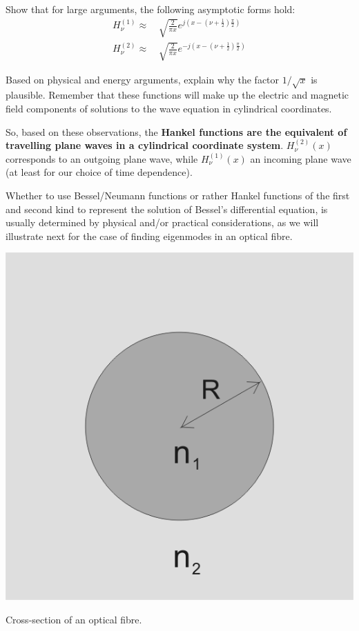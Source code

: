 \begin{exer}
Show that for large arguments, the following asymptotic forms hold:
\begin{align}
H_{\nu}^{(1)} \approx & \, \sqrt{\frac{2}{\pi x}} e^{j \left( x - \left(\nu + \frac{1}{2}\right)\frac{\pi}{2} \right)} \nonumber \\
  H_{\nu}^{(2)} \approx & \, \sqrt{\frac{2}{\pi x}} e^{-j \left( x - \left(\nu + \frac{1}{2}\right)\frac{\pi}{2} \right)}
\end{align}

Based on physical and energy arguments, explain why the factor $1/\sqrt{x}$ is plausible. Remember that these functions will make up the electric and magnetic field components of solutions to the wave equation in cylindrical coordinates.
                          
\end{exer}

So, based on these observations, the \textbf{Hankel functions are the equivalent of travelling plane waves in a cylindrical coordinate system}.   $H_{\nu}^{(2)}(x)$ corresponds to an outgoing plane wave, while $H_{\nu}^{(1)}(x)$ \is an incoming plane wave (at least for our choice of time dependence).

Whether to use Bessel/Neumann functions or rather Hankel functions of the first and second kind to represent the solution of Bessel's differential equation, is usually determined by physical and/or practical considerations, as we will illustrate next for the case of finding eigenmodes in an optical fibre.


\pagebreak




\begin{marginfigure}[3cm]
\centering
\includegraphics{bessel/figures/fibre}
\caption{Cross-section of an optical fibre.}
\label{fig-fibre}
\end{marginfigure}

